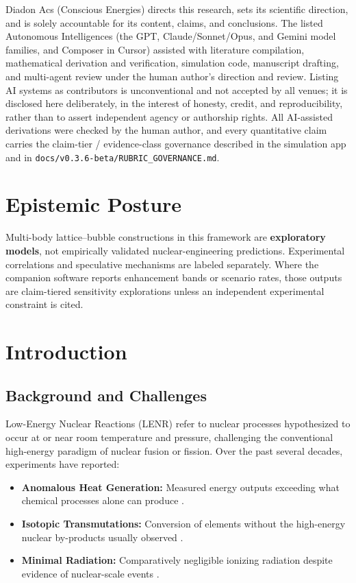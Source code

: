 \documentclass[11pt,a4paper]{article}
\begin{document}
Diadon Acs (Conscious Energies) directs this research, sets its scientific direction, and is solely accountable for its content, claims, and conclusions. The listed Autonomous Intelligences (the GPT, Claude/Sonnet/Opus, and Gemini model families, and Composer in Cursor) assisted with literature compilation, mathematical derivation and verification, simulation code, manuscript drafting, and multi-agent review under the human author's direction and review. Listing AI systems as contributors is unconventional and not accepted by all venues; it is disclosed here deliberately, in the interest of honesty, credit, and reproducibility, rather than to assert independent agency or authorship rights. All AI-assisted derivations were checked by the human author, and every quantitative claim carries the claim-tier / evidence-class governance described in the simulation app and in \texttt{docs/v0.3.6-beta/RUBRIC\_GOVERNANCE.md}.

\section*{Epistemic Posture}

Multi-body lattice--bubble constructions in this framework are \textbf{exploratory models}, not empirically validated nuclear-engineering predictions. Experimental correlations and speculative mechanisms are labeled separately. Where the companion software reports enhancement bands or scenario rates, those outputs are claim-tiered sensitivity explorations unless an independent experimental constraint is cited.

\section{Introduction}

\subsection{Background and Challenges}

Low-Energy Nuclear Reactions (LENR) refer to nuclear processes hypothesized to occur at or near room temperature and pressure, challenging the conventional high-energy paradigm of nuclear fusion or fission. Over the past several decades, experiments have reported:

\begin{itemize}
\item
  \textbf{Anomalous Heat Generation:} Measured energy outputs exceeding what chemical processes alone can produce \citep{fleischmann1989,arata2002}.
\item
  \textbf{Isotopic Transmutations:} Conversion of elements without the high-energy nuclear by-products usually observed \citep{mckubre1994,mizuno2007}.
\item
  \textbf{Minimal Radiation:} Comparatively negligible ionizing radiation despite evidence of nuclear-scale events \citep{storms2010,mizuno2019}.
\end{itemize}
\end{document}
